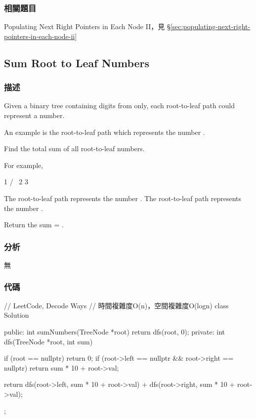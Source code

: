\subsubsection{相關題目}
\begindot
\item Populating Next Right Pointers in Each Node II，見 \S \ref{sec:populating-next-right-pointers-in-each-node-ii}
\myenddot


\subsection{Sum Root to Leaf Numbers} %
\label{sec:sum-root-to-leaf-numbers}


\subsubsection{描述}
Given a binary tree containing digits from  only, each root-to-leaf path could represent a number.

An example is the root-to-leaf path  which represents the number .

Find the total sum of all root-to-leaf numbers.

For example,
\begin{Code}
    1
   / \
  2   3
\end{Code}

The root-to-leaf path  represents the number .
The root-to-leaf path  represents the number .

Return the sum = .


\subsubsection{分析}
無

\subsubsection{代碼}

\begin{Code}
// LeetCode, Decode Ways
// 時間複雜度O(n)，空間複雜度O(logn)
class Solution {
public:
    int sumNumbers(TreeNode *root) {
        return dfs(root, 0);
    }
private:
    int dfs(TreeNode *root, int sum) {
        if (root == nullptr) return 0;
        if (root->left == nullptr && root->right == nullptr)
            return sum * 10 + root->val;

        return dfs(root->left, sum * 10 + root->val) +
                dfs(root->right, sum * 10 + root->val);
    }
};
\end{Code}


